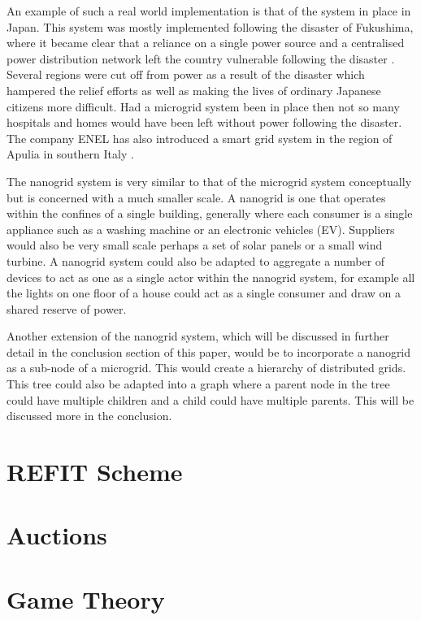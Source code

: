 \documentclass[a4paper, notitlepage]{report}
\begin{document}
An example of such a real world implementation is that of the system in place in
Japan. This system was mostly implemented following the disaster of Fukushima,
where it became clear that a reliance on a single power source and a centralised
power distribution network left the country vulnerable following the disaster
\cite{japan_microgrids}. Several regions were cut off from power as a result of
the disaster which hampered the relief efforts as well as making the lives of
ordinary Japanese citizens more difficult. Had a microgrid system been in place
then not so many hospitals and homes would have been left without power
following the disaster. The company ENEL has also introduced a smart grid system
in the region of Apulia in southern Italy \cite{sapienza2013enel}.  

The nanogrid system is very similar to that of the microgrid system conceptually
but is concerned with a much smaller scale. A nanogrid is one that operates
within the confines of a single building, generally where each consumer is a
single appliance such as a washing machine or an electronic vehicles (EV).
Suppliers would also be very small scale perhaps a set of solar panels or a
small wind turbine. A nanogrid system could also be adapted to aggregate a number
of devices to act as one as a single actor within the nanogrid system, for
example all the lights on one floor of a house could act as a single consumer
and draw on a shared reserve of power.

Another extension of the nanogrid system, which will be discussed in further
detail in the conclusion section of this paper, would be to incorporate a
nanogrid as a sub-node of a microgrid. This would create a hierarchy of
distributed grids. This tree could also be adapted into a graph where a parent
node in the tree could have multiple children and a child could have multiple
parents. This will be discussed more in the conclusion.
\chapter{REFIT Scheme}
\label{sec:org1181de5}
\chapter{Auctions}
\label{sec:orgc17a68d}
\chapter{Game Theory}
\label{sec:orgfc6e072}
\end{document}
